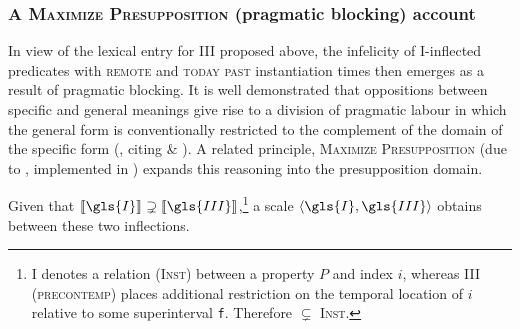 \subsubsection[\textsc{\textit{MaxPresupp 1}}: A blocking account]{A \textsc{Maximize Presupposition} (pragmatic blocking) account}\label{sec:MP1}

In view of the lexical entry for \gls{III} proposed above, the infelicity of \gls{I}-inflected predicates with \textsc{remote} and \textsc{today past} instantiation times then emerges as a result of pragmatic blocking. It is well demonstrated that oppositions between specific and general meanings give rise to a division of pragmatic labour in which the general form is conventionally restricted to the complement of the domain of the specific form (\citealp{Deo2015}, citing \citealp{Horn1984} \& \citealp{Horn2012a}). A related principle, \textsc{Maximize Presupposition} (due to \citealp{Heim1991}, implemented in \citealp{Sauerland2009}) expands this reasoning into the presupposition domain.


Given that $ \denote{\gls{I}} \supsetneq \denote{\gls{III}}$,\footnote{
	\gls{I} denotes a relation \textsc{(Inst)} between a property $ P $ and index $ i $, whereas \gls{III} \textsc{(precontemp)} places additional restriction on the temporal location of $ i $ relative to some superinterval \texttt{f}. Therefore $ \subsetneq $ \textsc{Inst}.
}
a scale $ \langle \gls{I},\gls{III}\rangle$ obtains between these two inflections.



